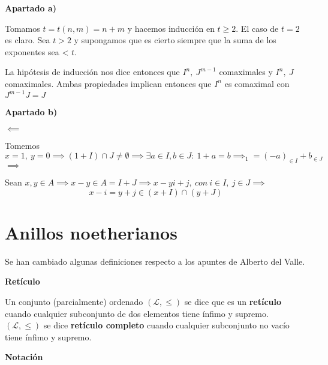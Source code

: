 \documentclass[openany]{book}
\begin{document}
\begin{exercise}

    \begin{flushright}
        \textbf{Apartado a)}
    \end{flushright}
    


    Tomamos $ t = t(n,m) = n+m $ y hacemos inducción en $ t\geq 2 $. El caso de $ t=2 $ es claro. Sea $ t >2  $ y supongamos que es cierto siempre que la suma de los exponentes sea < $ t $. 
    
    La hipótesis de inducción nos dice entonces que $ I^{n},\ J^{m-1} $ comaximales y $ I^{n},\ J $ comaximales. Ambas propiedades implican entonces que $ I^{n} $ es comaximal con $ J^{m-1}J = J $ 

    \begin{flushright}
        \textbf{Apartado b)}
    \end{flushright}
    $ \impliedby $

    Tomemos $ x = 1,\ y=0 \implies (1+I) \cap J \ne \emptyset \implies \exists a \in I, b \in J:\ 1+a=b \implies_1 = (-a)_{\in I}+b_{\in J} $\\
    $ \implies $

    Sean $ x,y \in A \implies x-y \in A = I+J \implies x-y i+j,\ con\ i \in I,\ j \in J \implies$
    $$ x-i = y+j \in (x+I) \cap (y+J) $$

\end{exercise}


\chapter{Anillos noetherianos}

\noindent Se han cambiado algunas definiciones respecto a los apuntes de Alberto del Valle.



\begin{definition}
    \textbf{Retículo}

    Un conjunto (parcialmente) ordenado $ (\mathcal{L},\leq )  $ se dice que es un \textbf{retículo} cuando cualquier subconjunto de dos elementos tiene ínfimo y supremo. $ (\mathcal{L},\leq ) $ se dice \textbf{retículo completo} cuando cualquier subconjunto no vacío tiene ínfimo y supremo.
\end{definition}

\begin{flushright}
    \textbf{Notación}
\end{flushright}
\end{document}

